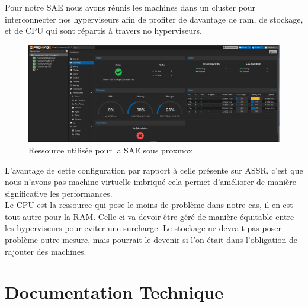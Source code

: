 \documentclass{article}
\begin{document}
Pour notre SAE nous avons réunis les machines dans un cluster pour interconnecter nos hyperviseurs
afin de profiter de davantage de ram, de stockage, et de CPU qui sont répartis à travers no hyperviseurs.

\begin{figure}[h]
    \centering
    \includegraphics[width=1\textwidth]{Images/Ressource.png}
    \caption{Ressource utilisée pour la SAE sous proxmox}
    \label{fig:solution1}
\end{figure}

L'avantage de cette configuration par rapport à celle présente sur ASSR, c'est que nous n'avons pas machine virtuelle imbriqué
cela permet d'améliorer de manière significative les performances. \\
Le CPU est la ressource qui pose le moins de problème dans notre cas, il en est tout autre pour la RAM.
Celle ci va devoir être géré de manière équitable entre les hyperviseurs pour eviter une surcharge.
Le stockage ne devrait pas poser problème outre mesure, mais pourrait le devenir si l'on était dans l'obligation de rajouter 
des machines.

\section{Documentation Technique}

%
\end{document}

